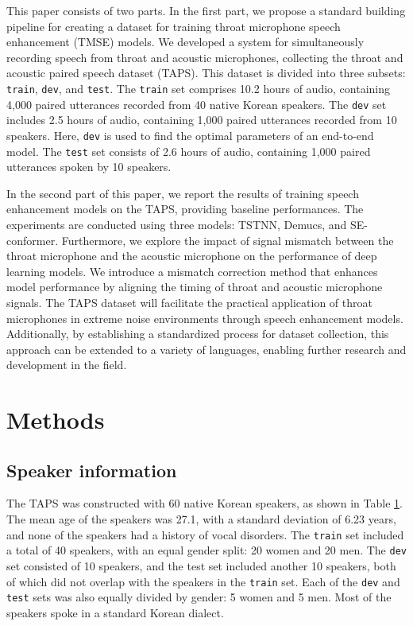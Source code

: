 \documentclass[10pt]{wlscirep}
\begin{document}
This paper consists of two parts. In the first part, we propose a standard building pipeline for creating a dataset for training throat microphone speech enhancement (TMSE) models. We developed a system for simultaneously recording speech from throat and acoustic microphones, collecting the throat and acoustic paired speech dataset (TAPS). This dataset is divided into three subsets: \texttt{train}, \texttt{dev}, and \texttt{test}. The \texttt{train} set comprises 10.2 hours of audio, containing 4,000 paired utterances recorded from 40 native Korean speakers. The \texttt{dev} set includes 2.5 hours of audio, containing 1,000 paired utterances recorded from 10 speakers. Here, \texttt{dev} is used to find the optimal parameters of an end-to-end model. The \texttt{test} set consists of 2.6 hours of audio, containing 1,000 paired utterances spoken by 10 speakers.


In the second part of this paper, we report the results of training speech enhancement models on the TAPS, providing baseline performances. The experiments are conducted using three models: TSTNN\cite{wang2021tstnn}, Demucs\cite{defossez2020real}, and SE-conformer\cite{kim21seconformer}. Furthermore, we explore the impact of signal mismatch between the throat microphone and the acoustic microphone on the performance of deep learning models. We introduce a mismatch correction method that enhances model performance by aligning the timing of throat and acoustic microphone signals. The TAPS dataset will facilitate the practical application of throat microphones in extreme noise environments through speech enhancement models. Additionally, by establishing a standardized process for dataset collection, this approach can be extended to a variety of languages, enabling further research and development in the field. 

\section*{Methods}
\subsection*{Speaker information}
The TAPS was constructed with 60 native Korean speakers, as shown in Table \hyperref[table:1]{1}. The mean age of the speakers was 27.1, with a standard deviation of 6.23 years, and none of the speakers had a history of vocal disorders. The \texttt{train} set included a total of 40 speakers, with an equal gender split: 20 women and 20 men. The \texttt{dev} set consisted of 10 speakers, and the test set included another 10 speakers, both of which did not overlap with the speakers in the \texttt{train} set. Each of the \texttt{dev} and \texttt{test} sets was also equally divided by gender: 5 women and 5 men. Most of the speakers spoke in a standard Korean dialect.
\end{document}
